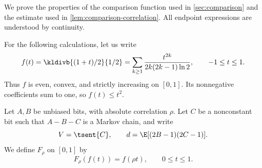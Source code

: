 
We prove the properties of the comparison function used in
\autoref{sec:comparison} and the estimate used in
\autoref{lem:comparison-correlation}.
All endpoint expressions are understood by continuity.

For the following calculations, let us write
\begin{equation*}
  f(t)=\kldivb{(1+t)/2}{1/2}
  =\sum_{k\ge1}\frac{t^{2k}}{2k(2k-1)\ln2},
  \qquad -1\le t\le1.
\end{equation*}
Thus $f$ is even, convex, and strictly increasing on $[0,1]$.
Its nonnegative coefficients sum to one, so $f(t)\le t^2$.

Let $A,B$ be unbiased bits, with absolute correlation $\rho$.
Let $C$ be a nonconstant bit such that $A-B-C$ is a Markov chain,
and write
\begin{equation*}
  V=\tsent{C},\qquad
  d=\E[(2B-1)(2C-1)].
\end{equation*}
We define $F_\rho$ on $[0,1]$ by
\begin{equation*}
  F_\rho(f(t))=f(\rho t),\qquad 0\le t\le1.
\end{equation*}

